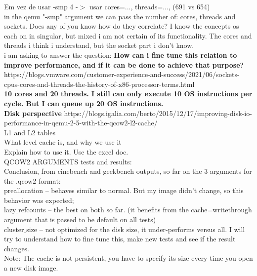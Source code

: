 \documentclass[11pt, a4paper, oneside]{article}
\theoremstyle{definition}
\begin{document}
Em vez de usar -smp 4 -$>$ usar cores=..., threads=..., (691 vs 654)\\

in the qemu "-smp" argument we can pass the number of: cores, threads and sockets. Does any of you know how do they correlate? I know the concepts os each on in singular, but mixed i am not certain of its functionality. The cores and threads i think i understand, but the socket part i don't know.\\
i am asking to answer the question: \textbf{How can i fine tune this relation to improve performance, and if it can be done to achieve that purpose?}\\
https://blogs.vmware.com/customer-experience-and-success/2021/06/sockets-cpus-cores-and-threads-the-history-of-x86-processor-terms.html\\
\textbf{10 cores and 20 threads. I still can only execute 10 OS instructions per cycle. But I can queue up 20 OS instructions. }\\

\textbf{Disk perspective}
https://blogs.igalia.com/berto/2015/12/17/improving-disk-io-performance-in-qemu-2-5-with-the-qcow2-l2-cache/\\
L1 and L2 tables\\
What level cache is, and why we use it\\
Explain how to use it. Use the excel doc.\\


QCOW2 ARGUMENTS tests and results:\\ 

    Conclusion, from cinebench and geekbench outputs, so far on the 3 arguments for the .qcow2 format: \\

        preallocation -- behaves similar to normal. But my image didn't change, so this behavior was expected; \\

        lazy$\_$refcounts -- the best on both so far. (it benefits from the cache=writethrough argument that is passed to be default on all tests) \\

        cluster$\_$size -- not optimized for the disk size, it under-performs versus all. I will try to understand how to fine tune this, make new tests and see if the result changes. \\

Note: The cache is not persistent, you have to specify its size every time you open a new disk image. \\
\end{document}
